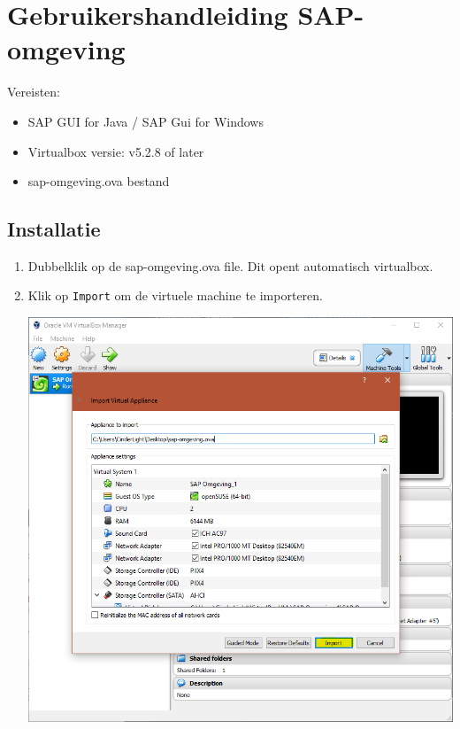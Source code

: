 \documentclass[a4paper, 11pt]{article}
\providecommand{\tightlist}{%
    \setlength{\itemsep}{0pt}
    \setlength{\parskip}{0pt}
}
\begin{document}
\section{Gebruikershandleiding SAP-omgeving}

Vereisten:

\begin{itemize}
\tightlist
\item
  SAP GUI for Java / SAP Gui for Windows
\item
  Virtualbox versie: v5.2.8 of later
\item
  sap-omgeving.ova bestand
\end{itemize}

\subsection{Installatie}

\begin{enumerate}
\tightlist
\item
  Dubbelklik op de sap-omgeving.ova file. Dit opent automatisch
  virtualbox.
\item
  Klik op \texttt{Import} om de virtuele machine te importeren.
  \begin{center}
      \includegraphics[scale=0.7,center]{img/import.png}
  \end{center}
\end{enumerate}
\end{document}
